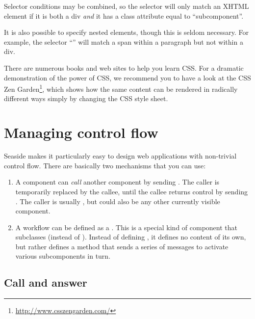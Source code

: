 \documentclass[a4paper,10pt,twoside]{book}
\begin{document}
{{%

Selector conditions may be combined, so the selector  will only match an XHTML element if it is both a div \emph{and} it has a class attribute equal to ``subcomponent''.

It is also possible to specify nested elements, though this is seldom necessary.
For example, the selector ``'' will match a span within a paragraph but not within a div.

There are numerous books and web sites to help you learn CSS.
For a dramatic demonstration of the power of CSS, we recommend you to have a look at the CSS Zen Garden\footnote{\url{http://www.csszengarden.com/}}, which shows how the same content can be rendered in radically different ways simply by changing the CSS style sheet.

\section{Managing control flow}

Seaside makes it particularly easy to design web applications with non-trivial control flow.
There are basically two mechanisms that you can use:

\begin{enumerate}
  \item A component can \emph{call} another component by sending .
  The caller is temporarily replaced by the callee, until the callee returns control by sending .
  The caller is usually , but could also be any other currently visible component.

  \item A workflow can be defined as a .
  This is a special kind of component that subclasses  (instead of ). 
  Instead of defining , it defines no content of its own, but rather defines a  method that sends a series of  messages to activate various subcomponents in turn.
\end{enumerate}

\subsection{Call and answer}

}}
\end{document}
